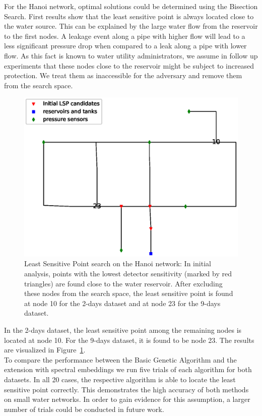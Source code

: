 For the Hanoi network, optimal solutions could be determined using the
Bisection Search. First results show that the least sensitive point is
always located close to the water source. This can be explained by the large water flow
from the reservoir to the first nodes. A leakage event along a pipe with
higher flow will lead to a less significant pressure drop when compared to a
leak along a pipe with lower flow. As this fact is known to water utility
administrators, we assume in follow up experiments that these nodes close to
the reservoir might be subject to increased protection. We treat them as
inaccessible for the adversary and remove them from the search space. 
\begin{figure}[h]
\centering
\includegraphics[height=0.3\textheight,width=\textwidth,keepaspectratio=True]{Figures/lsp_candidates_hanoi.eps}
\caption{Least Sensitive Point search on the Hanoi network: In initial
analysis, points with the lowest detector sensitivity (marked by red
triangles) are found close to the water reservoir. After excluding these
nodes from the search space, the least sensitive point is found at node 10
for the 2-days dataset and at node 23 for the 9-days dataset.
}
\label{fig:lsp_candidates_hanoi}
\end{figure}
In the 2-days dataset, the least sensitive point among the remaining nodes
is located at node 10. For the 9-days dataset, it is found to be node 23.
The results are visualized in Figure~\ref{fig:lsp_candidates_hanoi}.\\
To compare the performance between the Basic Genetic Algorithm and the extension with
spectral embeddings we run five trials of each algorithm for both datasets. In
all 20 cases, the respective algorithm is able to locate the least sensitive
point correctly. This demonstrates the high accuracy of both methods on
small water networks. In order to gain evidence for this assumption, a larger
number of trials could be conducted in future work.
